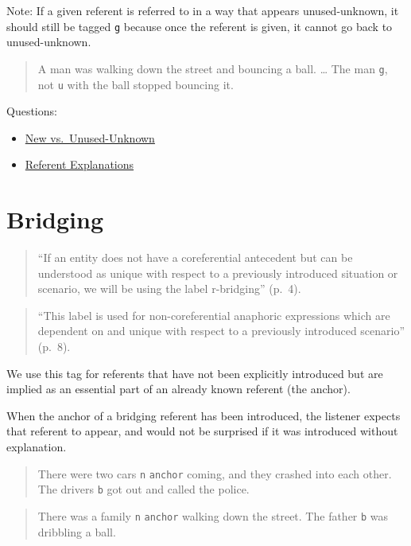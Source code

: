 \documentclass[
]{book}
\providecommand{\tightlist}{%
  \setlength{\itemsep}{0pt}\setlength{\parskip}{0pt}}
\begin{document}
Note:
If a given referent is referred to in a way that appears
unused-unknown, it should still be tagged \texttt{g}
because once the referent is given, it cannot go back to unused-unknown.

\begin{quote}
A man was walking down the street and bouncing a ball.
\ldots{}
The man \texttt{g}, not \texttt{u} with the ball stopped bouncing it.
\end{quote}

Questions:

\begin{itemize}
\tightlist
\item
  \protect\hyperlink{new-vs.-unused-unknown}{New vs.~Unused-Unknown}
\item
  \protect\hyperlink{referent-explanations}{Referent Explanations}
\end{itemize}

\hypertarget{bridging}{%
\section{Bridging}\label{bridging}}

\begin{quote}
``If an entity does not have a coreferential antecedent but can be understood as unique with respect to a previously introduced situation or scenario, we will be using the label r-bridging'' (p.~4).
\end{quote}

\begin{quote}
``This label is used for non-coreferential anaphoric expressions which are dependent on and unique with respect to a previously introduced scenario'' (p.~8).
\end{quote}

We use this tag for referents that have not been explicitly introduced but are implied as an essential part of an already known referent (the anchor).

When the anchor of a bridging referent has been introduced,
the listener expects that referent to appear,
and would not be surprised if it was introduced without explanation.

\begin{quote}
There were two cars \texttt{n} \texttt{anchor} coming, and they crashed into each other.
The drivers \texttt{b} got out and called the police.
\end{quote}

\begin{quote}
There was a family \texttt{n} \texttt{anchor} walking down the street.
The father \texttt{b} was dribbling a ball.
\end{quote}
\end{document}
